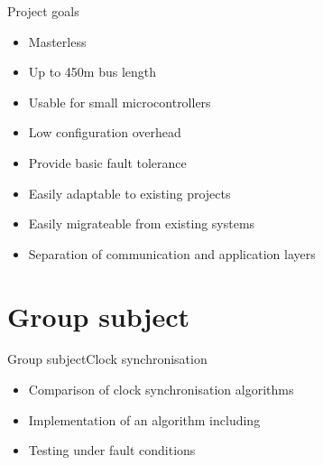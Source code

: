 \documentclass{beamer}
\begin{document}
\begin{frame}{Project goals}
\begin{center}
\begin{itemize}
 \item \begin{large}Masterless\end{large}
 \item \begin{large}Up to 450m bus length\end{large}
 \item \begin{large}Usable for small microcontrollers\end{large}
 \item \begin{large}Low configuration overhead\end{large}
 \item \begin{large}Provide basic fault tolerance\end{large}
 \item \begin{large}Easily adaptable to existing projects\end{large}
 \item \begin{large}Easily migrateable from existing systems\end{large}
 \item \begin{large}Separation of communication and application layers\end{large}
\end{itemize}
\end{center}

\end{frame}

\section{Group subject}
\begin{frame}{Group subject}{Clock synchronisation}
  \begin{itemize}
    \item \begin{large}Comparison of clock synchronisation algorithms\end{large}
    \item \begin{large}Implementation of an algorithm including\end{large}
    \item \begin{large}Testing under fault conditions\end{large}
  \end{itemize}
\end{frame}
\end{document}
